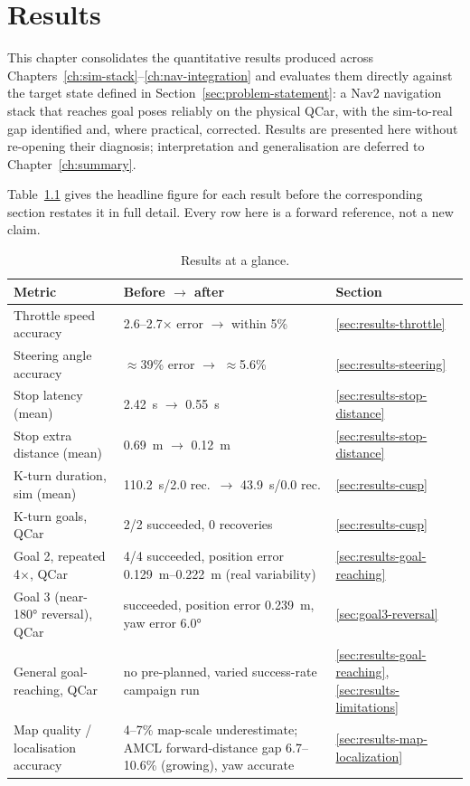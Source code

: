\chapter{Results}
\label{ch:results}

This chapter consolidates the quantitative results produced across
Chapters~\ref{ch:sim-stack}--\ref{ch:nav-integration} and evaluates
them directly against the target state defined in
Section~\ref{sec:problem-statement}: a Nav2 navigation stack that
reaches goal poses reliably on the physical QCar, with the
sim-to-real gap identified and, where practical, corrected. Results
are presented here without re-opening their diagnosis; interpretation
and generalisation are deferred to Chapter~\ref{ch:summary}.

Table~\ref{tab:results-at-a-glance} gives the headline figure for
each result before the corresponding section restates it in full
detail. Every row here is a forward reference, not a new claim.

\begin{table}[htbp]
  \centering
  \caption{Results at a glance.}
  \label{tab:results-at-a-glance}
  \begin{tabular}{@{}p{4.1cm}p{5.3cm}p{3.9cm}@{}}
    \toprule
    Metric & Before $\to$ after & Section \\
    \midrule
    Throttle speed accuracy & 2.6--2.7$\times$ error $\to$ within 5\% & \ref{sec:results-throttle} \\
    Steering angle accuracy & $\approx$39\% error $\to$ $\approx$5.6\% & \ref{sec:results-steering} \\
    Stop latency (mean) & \SI{2.42}{\second} $\to$ \SI{0.55}{\second} & \ref{sec:results-stop-distance} \\
    Stop extra distance (mean) & \SI{0.69}{\meter} $\to$ \SI{0.12}{\meter} & \ref{sec:results-stop-distance} \\
    K-turn duration, sim (mean) & \SI{110.2}{\second}/2.0 rec.\ $\to$ \SI{43.9}{\second}/0.0 rec. & \ref{sec:results-cusp} \\
    K-turn goals, QCar & 2/2 succeeded, 0 recoveries & \ref{sec:results-cusp} \\
    Goal 2, repeated 4$\times$, QCar & 4/4 succeeded, position error \SIrange{0.129}{0.222}{\meter} (real variability) & \ref{sec:results-goal-reaching} \\
    Goal 3 (near-\ang{180} reversal), QCar & succeeded, position error \SI{0.239}{\meter}, yaw error \ang{6.0} & \ref{sec:goal3-reversal} \\
    General goal-reaching, QCar & no pre-planned, varied success-rate campaign run & \ref{sec:results-goal-reaching}, \ref{sec:results-limitations} \\
    Map quality / localisation accuracy & 4--7\% map-scale underestimate; AMCL forward-distance gap 6.7--10.6\% (growing), yaw accurate & \ref{sec:results-map-localization} \\
    \bottomrule
  \end{tabular}
\end{table}

